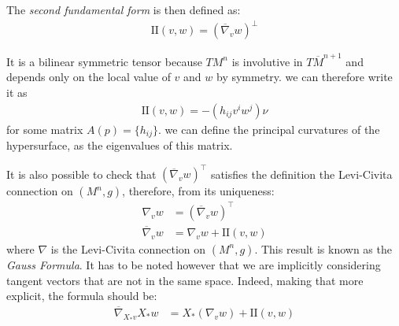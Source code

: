 \begin{defin}
	The {\em second fundamental form} is then defined as: 
	\begin{align*}
	 	\mathrm{I\!I} (v, w) =  (\overline{\nabla}_v w )^\bot 	
	\end{align*} 
\end{defin}
It is a bilinear symmetric tensor because $TM^n$ is involutive in $T\overline{M}^{n+1}$ and depends only on the local value of $v$ and $w$ by symmetry. we can therefore write it as
\begin{align*}
	\mathrm{I\!I} (v, w) = -(h_{ij}v^iw^j)\nu
\end{align*} 
for some matrix $A(p)=\{h_{ij}\}$. we can define the principal curvatures of the hypersurface, as the eigenvalues of this matrix.

It is also possible to check that $(\overline{\nabla}_v w )^\top$ satisfies the definition the Levi-Civita connection on $(M^n, g)$, therefore, from its uniqueness:
\begin{align*}
	\nabla_v w &=  (\overline{\nabla}_v w )^\top	\\
	\overline{\nabla}_v w &= \nabla_v w  + \mathrm{I\!I} (v, w) 
\end{align*} 
where $\nabla$ is the Levi-Civita connection on $(M^n, g)$. This result is known as the {\em Gauss Formula}. It has to be noted however that we are implicitly considering tangent vectors that are not in the same space. Indeed, making that more explicit, the formula should be:
\begin{align*}
	\overline{\nabla}_{X_*v} X_* w &= X_* (\nabla_v w)  + \mathrm{I\!I} (v, w) 
\end{align*}

